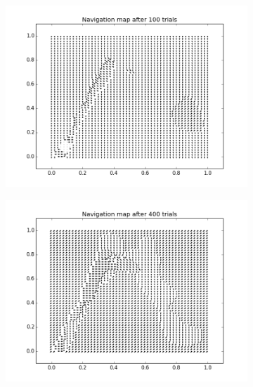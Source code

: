 \begin{figure}[h!]
\centering
\begin{subfigure}[b]{0.6\textwidth}
    \includegraphics[width=\textwidth]{figures/nmap_100.png}
\end{subfigure}
\begin{subfigure}[b]{0.6\textwidth}
    \includegraphics[width=\textwidth]{figures/nmap_400.png}
\end{subfigure}
\begin{subfigure}[b]{0.6\textwidth}

\end{subfigure}
\end{figure}
